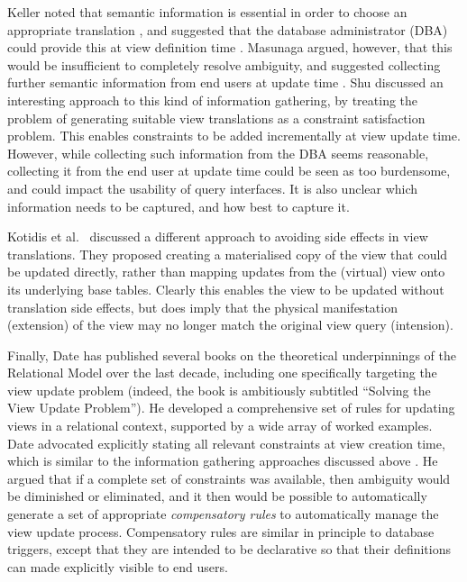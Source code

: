 \documentclass{sig-alternate-05-2015}
\newcounter{constraint}
\begin{document}
Keller noted that semantic information is essential in order to choose an appropriate translation \cite{Keller.A-1986a-Role}, and suggested that the da\-ta\-base administrator (DBA) could provide this at view definition time \cite{Keller.A-1985a-Algorithms}. Masunaga argued, however, that this would be insufficient to completely resolve ambiguity, and suggested collecting further semantic information from end users at update time \cite{Masunaga.Y-1984a-Relational}. Shu \cite{Shu.H-2000a-Using} discussed an interesting approach to this kind of information gathering, by treating the problem of generating suitable view translations as a constraint satisfaction problem. This enables constraints to be added incrementally at view update time. However, while collecting such information from the DBA seems reasonable, collecting it from the end user at update time could be seen as too burdensome, and could impact the usability of query interfaces. It is also unclear which information needs to be captured, and how best to capture it.

Kotidis et al.\ \cite{Kotidis.Y-2006a-Updates} discussed a different approach to avoiding side effects in view translations. They proposed creating a materialised copy of the view that could be updated directly, rather than mapping updates from the (virtual) view onto its underlying base tables. Clearly this enables the view to be updated without translation side effects, but does imply that the physical manifestation (extension) of the view may no longer match the original view query (intension).

Finally, Date has published several books on the theoretical underpinnings of the Relational Model over the last decade, including one specifically targeting the view update problem \cite{Date.C-2013a-View} (indeed, the book is ambitiously subtitled ``Solving the View Update Problem''). He developed a comprehensive set of rules for updating views in a relational context, supported by a wide array of worked examples. Date advocated explicitly stating all relevant constraints at view creation time, which is similar to the information gathering approaches discussed above \cite{Keller.A-1985a-Algorithms,Masunaga.Y-1984a-Relational,Shu.H-2000a-Using}. He argued that if a complete set of constraints was available, then ambiguity would be diminished or eliminated, and it then would be possible to automatically generate a set of appropriate \emph{compensatory rules} to automatically manage the view update process. Compensatory rules are similar in principle to database triggers, except that they are intended to be declarative so that their definitions can made explicitly visible to end users.
\end{document}
